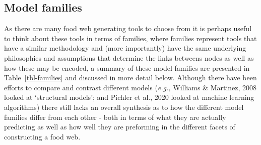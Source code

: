 \documentclass[
]{article}
\begin{document}
\subsection{Model families}\label{model-families}

As there are many food web generating tools to choose from it is perhaps
useful to think about these tools in terms of families, where families
represent tools that have a similar methodology and (more importantly)
have the same underlying philosophies and assumptions that determine the
links betweens nodes as well as how these may be encoded, a summary of
these model families are presented in Table~\ref{tbl-families} and
discussed in more detail below. Although there have been efforts to
compare and contrast different models (\emph{e.g.,} Williams \&
Martinez, 2008 looked at `structural models'; and Pichler et al., 2020
looked at machine learning algorithms) there still lacks an overall
synthesis as to how the different model families differ from each other
- both in terms of what they are actually predicting as well as how well
they are preforming in the different facets of constructing a food web.
\end{document}
